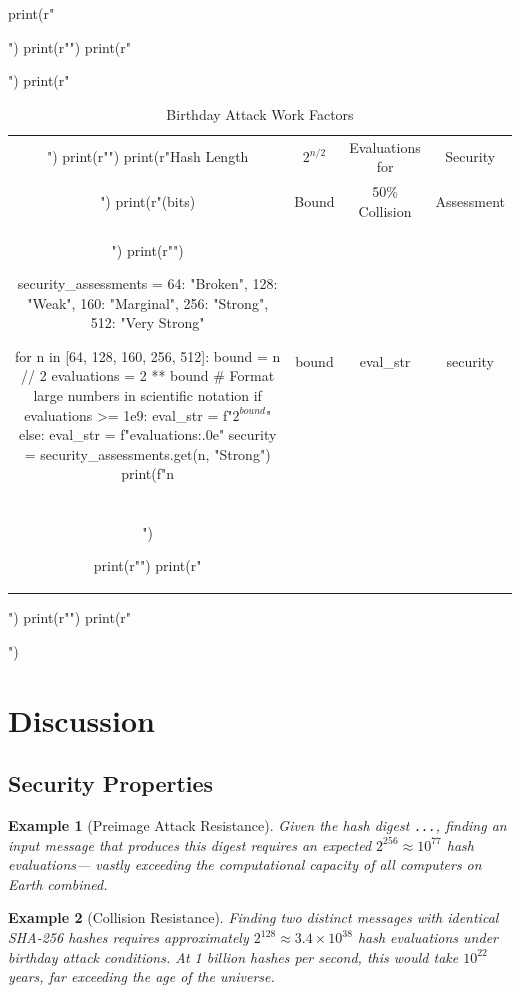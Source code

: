 \documentclass[a4paper, 11pt]{article}
\newtheorem{example}{Example}[section]
\begin{document}
\begin{pycode}
print(r"\begin{table}[htbp]")
print(r"\centering")
print(r"\caption{Birthday Attack Work Factors}")
print(r"\begin{tabular}{cccc}")
print(r"\toprule")
print(r"Hash Length & $2^{n/2}$ & Evaluations for & Security \\")
print(r"(bits) & Bound & 50\% Collision & Assessment \\")
print(r"\midrule")

security_assessments = {
    64: "Broken",
    128: "Weak",
    160: "Marginal",
    256: "Strong",
    512: "Very Strong"
}

for n in [64, 128, 160, 256, 512]:
    bound = n // 2
    evaluations = 2 ** bound
    # Format large numbers in scientific notation
    if evaluations >= 1e9:
        eval_str = f"$2^{{{bound}}}$"
    else:
        eval_str = f"{evaluations:.0e}"
    security = security_assessments.get(n, "Strong")
    print(f"{n} & {bound} & {eval_str} & {security} \\\\")

print(r"\bottomrule")
print(r"\end{tabular}")
print(r"\label{tab:birthday}")
print(r"\end{table}")
\end{pycode}

\section{Discussion}

\subsection{Security Properties}

\begin{example}[Preimage Attack Resistance]
Given the hash digest \texttt{...}, finding an input message
that produces this digest requires an expected $2^{256} \approx 10^{77}$ hash evaluations—
vastly exceeding the computational capacity of all computers on Earth combined.
\end{example}

\begin{example}[Collision Resistance]
Finding two distinct messages with identical SHA-256 hashes requires approximately
$2^{128} \approx 3.4 \times 10^{38}$ hash evaluations under birthday attack conditions.
At 1 billion hashes per second, this would take $10^{22}$ years, far exceeding the
age of the universe.
\end{example}
\end{document}

